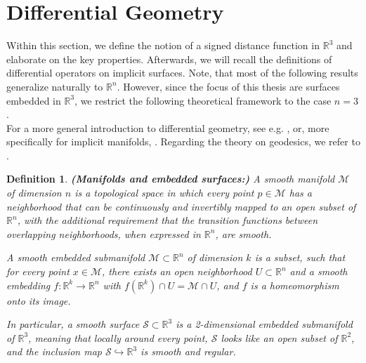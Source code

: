 \documentclass[12pt,openany]{book}
\newcommand{\R}{\mathbb{R}}
\theoremstyle{plainnormal}
\newtheorem{definition}[theorem]{Definition}
\theoremstyle{remark}
\begin{document}
\section{Differential Geometry}
Within this section, we define the notion of a signed distance function in $\R^3$ and elaborate on the key properties. Afterwards, we will recall the definitions of differential operators on implicit surfaces. Note, that most of the following results generalize naturally to $\R^n$. However, since the focus of this thesis are surfaces embedded in $\R^3$, we restrict the following theoretical framework to the case $n=3$.\\
For a more general introduction to differential geometry, see e.g. \cite{Lee00}, or, more specifically for implicit manifolds, \cite{Dziuk_Elliott_2013}. Regarding the theory on geodesics, we refer to \cite{Dacorogna}.
\begin{definition}\textbf{(Manifolds and embedded surfaces:)}
A \emph{smooth manifold} \(\mathcal{M}\) of dimension \(n\) is a topological space in which every point \(p \in \mathcal{M}\) has a neighborhood that can be continuously and invertibly mapped to an open subset of \(\mathbb{R}^n\), with the additional requirement that the transition functions between overlapping neighborhoods, when expressed in \(\mathbb{R}^n\), are smooth.\par
A \emph{smooth embedded submanifold} \(\mathcal{M} \subset \mathbb{R}^n\) of dimension \(k\) is a subset, such that for every point \(x \in \mathcal{M}\), there exists an open neighborhood \(U \subset \mathbb{R}^n\) and a smooth embedding \(f: \mathbb{R}^k \to \mathbb{R}^n\) with \(f(\mathbb{R}^k) \cap U = \mathcal{M} \cap U\), and \(f\) is a homeomorphism onto its image.\par
In particular, a \emph{smooth surface} \(\mathcal{S} \subset \mathbb{R}^3\) is a 2-dimensional embedded submanifold of \(\mathbb{R}^3\), meaning that locally around every point, \(\mathcal{S}\) looks like an open subset of \(\mathbb{R}^2\), and the inclusion map \(\mathcal{S} \hookrightarrow \mathbb{R}^3\) is smooth and regular.
\end{definition}
\end{document}
